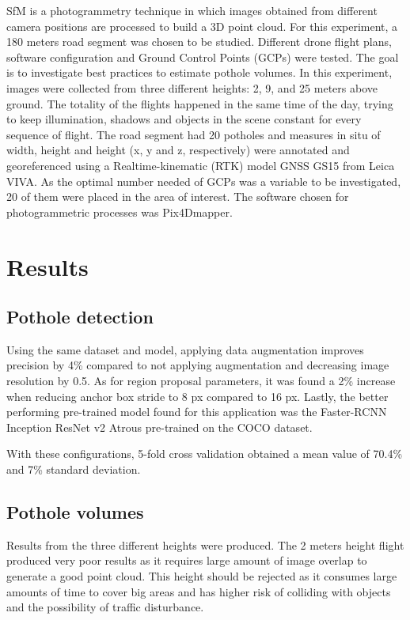 \documentclass{article}
\begin{document}
SfM is a photogrammetry technique in which images obtained from different camera positions are processed to build a 3D point cloud. For this experiment, a 180 meters road segment was chosen to be studied. Different drone flight plans, software configuration and Ground Control Points (GCPs) were tested. The goal is to investigate best practices to estimate pothole volumes. In this experiment, images were collected from three different heights: 2, 9, and 25 meters above ground. The totality of the flights happened in the same time of the day, trying to keep illumination, shadows and objects in the scene constant for every sequence of flight. The road segment had 20 potholes and measures in situ of width, height and height (x, y and z, respectively) were annotated and georeferenced using a Realtime-kinematic (RTK) model GNSS GS15 from Leica VIVA. As the optimal number needed of GCPs was a variable to be investigated, 20 of them were placed in the area of interest. The software chosen for photogrammetric processes was Pix4Dmapper.


\section{Results}
\label{sec:results}

\subsection{Pothole detection}
\label{ssec:cnn_result}

Using the same dataset and model, applying data augmentation improves precision by 4\% compared to not applying augmentation and decreasing image resolution by 0.5. As for region proposal parameters, it was found a 2\% increase when reducing anchor box stride to 8 px compared to 16 px. Lastly, the better performing pre-trained model found for this application was the Faster-RCNN Inception ResNet v2 Atrous pre-trained on the COCO dataset.

With these configurations, 5-fold cross validation obtained a mean value of 70.4\% and 7\% standard deviation. 
 
\subsection{Pothole volumes}
\label{sssec:sfm_result}

Results from the three different heights were produced. The 2 meters height flight produced very poor results as it requires large amount of image overlap to generate a good point cloud. This height should be rejected as it consumes large amounts of time to cover big areas and has higher risk of colliding with objects and the possibility of traffic disturbance.
\end{document}

